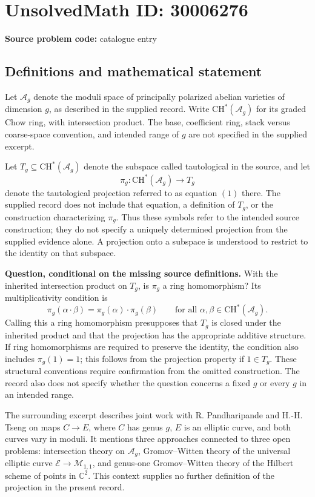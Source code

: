 \documentclass[11pt]{article}
\newcommand{\C}{\mathbb{C}}
\begin{document}
\section*{UnsolvedMath ID: 30006276}
\textbf{Source problem code:} catalogue entry
\subsection{Definitions and mathematical statement}
Let \(\mathcal A_g\) denote the moduli space of principally polarized abelian varieties of dimension \(g\), as described in the supplied record. Write \(\mathrm{CH}^{*}(\mathcal A_g)\) for its graded Chow ring, with intersection product. The base, coefficient ring, stack versus coarse-space convention, and intended range of \(g\) are not specified in the supplied excerpt.

Let \(T_g\subseteq\mathrm{CH}^{*}(\mathcal A_g)\) denote the subspace called tautological in the source, and let
\[
\pi_g:\mathrm{CH}^{*}(\mathcal A_g)\longrightarrow T_g
\]
denote the tautological projection referred to as equation \((1)\) there. The supplied record does not include that equation, a definition of \(T_g\), or the construction characterizing \(\pi_g\). Thus these symbols refer to the intended source construction; they do not specify a uniquely determined projection from the supplied evidence alone. A projection onto a subspace is understood to restrict to the identity on that subspace.

\textbf{Question, conditional on the missing source definitions.} With the inherited intersection product on \(T_g\), is \(\pi_g\) a ring homomorphism? Its multiplicativity condition is
\[
\pi_g(\alpha\cdot\beta)=\pi_g(\alpha)\cdot\pi_g(\beta)
\qquad\text{for all }\alpha,\beta\in\mathrm{CH}^{*}(\mathcal A_g).
\]
Calling this a ring homomorphism presupposes that \(T_g\) is closed under the inherited product and that the projection has the appropriate additive structure. If ring homomorphisms are required to preserve the identity, the condition also includes \(\pi_g(1)=1\); this follows from the projection property if \(1\in T_g\). These structural conventions require confirmation from the omitted construction. The record also does not specify whether the question concerns a fixed \(g\) or every \(g\) in an intended range.

The surrounding excerpt describes joint work with R. Pandharipande and H.-H. Tseng on maps \(C\to E\), where \(C\) has genus \(g\), \(E\) is an elliptic curve, and both curves vary in moduli. It mentions three approaches connected to three open problems: intersection theory on \(\mathcal A_g\), Gromov--Witten theory of the universal elliptic curve \(\mathcal E\to\mathcal M_{1,1}\), and genus-one Gromov--Witten theory of the Hilbert scheme of points in \(\C^2\). This context supplies no further definition of the projection in the present record.
\end{document}
